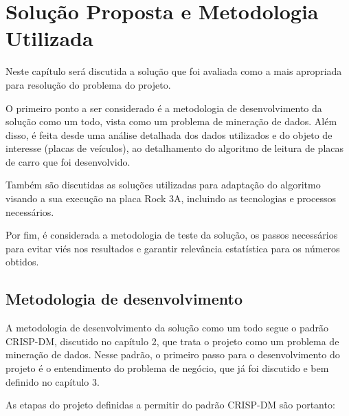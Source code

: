 \chapter{Solução Proposta e Metodologia Utilizada}

Neste capítulo será discutida a solução que foi avaliada como a mais apropriada para resolução do problema do projeto. 

O primeiro ponto a ser considerado é a metodologia de desenvolvimento da solução como um todo, vista como um problema de mineração de dados. Além disso, é feita desde uma análise detalhada dos dados utilizados e do objeto de interesse (placas de veículos), ao detalhamento do algoritmo de leitura de placas de carro que foi desenvolvido.

Também são discutidas as soluções utilizadas para adaptação do algoritmo visando a sua execução na placa Rock 3A, incluindo as tecnologias e processos necessários.

Por fim, é considerada a metodologia de teste da solução, os passos necessários para evitar viés nos resultados e garantir relevância estatística para os números obtidos.

\section{Metodologia de desenvolvimento}

A metodologia de desenvolvimento da solução como um todo segue o padrão CRISP-DM, discutido no capítulo 2, que trata o projeto como um problema de mineração de dados. Nesse padrão, o primeiro passo para o desenvolvimento do projeto é o entendimento do problema de negócio, que já foi discutido e bem definido no capítulo 3.

As etapas do projeto definidas a permitir do padrão CRISP-DM são portanto:


